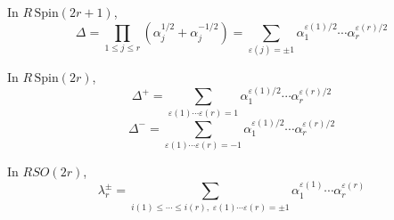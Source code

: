 In $R\,\text{Spin}(2r+1)$,
$$\Delta = \prod_{1 \leq j \leq r} (\alpha_j^{1/2} + \alpha_j^{-1/2}) = \sum_{\varepsilon(j) = \pm 1} \alpha_1^{\varepsilon(1)/2} \cdots \alpha_r^{\varepsilon(r)/2}$$

In $R\,\text{Spin}(2r)$,
$$\Delta^+ = \sum_{\varepsilon(1) \cdots \varepsilon(r) = 1} \alpha_1^{\varepsilon(1)/2} \cdots \alpha_r^{\varepsilon(r)/2}$$
$$\Delta^- = \sum_{\varepsilon(1) \cdots \varepsilon(r) = -1} \alpha_1^{\varepsilon(1)/2} \cdots \alpha_r^{\varepsilon(r)/2}$$

In $RSO(2r)$,
$$\lambda_r^\pm = \sum_{i(1) \leq \cdots \leq i(r), \; \varepsilon(1) \cdots \varepsilon(r) = \pm 1} \alpha_1^{\varepsilon(1)} \cdots \alpha_r^{\varepsilon(r)}$$

